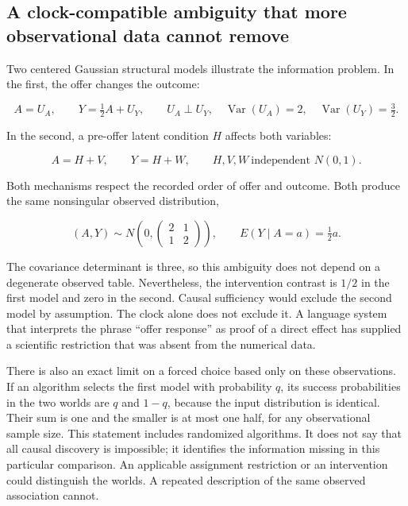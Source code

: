 \hypertarget{a-clock-compatible-ambiguity-that-more-observational-data-cannot-remove}{%
\subsection{A clock-compatible ambiguity that more observational data
cannot
remove}\label{a-clock-compatible-ambiguity-that-more-observational-data-cannot-remove}}

Two centered Gaussian structural models illustrate the information
problem. In the first, the offer changes the outcome:

\[
 A=U_A,\qquad Y=\tfrac12 A+U_Y,\qquad
 U_A\perp U_Y,\quad
 \operatorname{Var}(U_A)=2,\quad\operatorname{Var}(U_Y)=\tfrac32.
\]

In the second, a pre-offer latent condition \(H\) affects both
variables:

\[
 A=H+V,\qquad Y=H+W,\qquad
 H,V,W\ \text{independent }N(0,1).
\]

Both mechanisms respect the recorded order of offer and outcome. Both
produce the same nonsingular observed distribution,

\[
 (A,Y)\sim N\!\left(0,
 \begin{pmatrix}2&1\\1&2\end{pmatrix}\right),
 \qquad E(Y\mid A=a)=\tfrac12a.
\]

The covariance determinant is three, so this ambiguity does not depend
on a degenerate observed table. Nevertheless, the intervention contrast
is \(1/2\) in the first model and zero in the second. Causal sufficiency
would exclude the second model by assumption. The clock alone does not
exclude it. A language system that interprets the phrase ``offer
response'' as proof of a direct effect has supplied a scientific
restriction that was absent from the numerical data.

There is also an exact limit on a forced choice based only on these
observations. If an algorithm selects the first model with probability
\(q\), its success probabilities in the two worlds are \(q\) and
\(1-q\), because the input distribution is identical. Their sum is one
and the smaller is at most one half, for any observational sample size.
This statement includes randomized algorithms. It does not say that all
causal discovery is impossible; it identifies the information missing in
this particular comparison. An applicable assignment restriction or an
intervention could distinguish the worlds. A repeated description of the
same observed association cannot.

